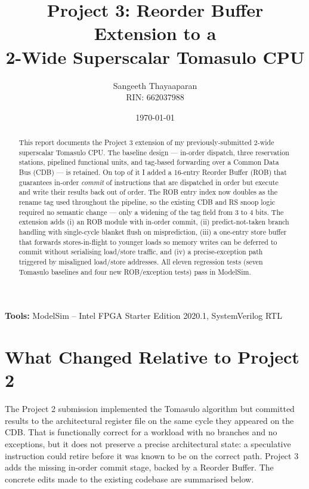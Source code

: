 \documentclass[11pt]{article}
\title{Project 3: Reorder Buffer Extension to a\\2-Wide Superscalar Tomasulo CPU}
\author{Sangeeth Thayaaparan \\ RIN: 662037988}
\date{\today}
\begin{document}
\maketitle

\begin{center}
  \large\textbf{Tools:} ModelSim -- Intel FPGA Starter Edition 2020.1, SystemVerilog RTL
\end{center}

\begin{abstract}
  This report documents the Project 3 extension of my previously-submitted 2-wide
  superscalar Tomasulo CPU. The baseline design --- in-order dispatch, three
  reservation stations, pipelined functional units, and tag-based forwarding over a
  Common Data Bus (CDB) --- is retained. On top of it I added a 16-entry Reorder
  Buffer (ROB) that guarantees in-order \emph{commit} of instructions that are
  dispatched in order but execute and write their results back out of order. The
  ROB entry index now doubles as the rename tag used throughout the pipeline, so
  the existing CDB and RS snoop logic required no semantic change --- only a
  widening of the tag field from 3 to 4 bits. The extension adds (i) an ROB
  module with in-order commit, (ii) predict-not-taken branch handling with
  single-cycle blanket flush on misprediction, (iii) a one-entry store buffer
  that forwards stores-in-flight to younger loads so memory writes can be deferred
  to commit without serialising load/store traffic, and (iv) a precise-exception
  path triggered by misaligned load/store addresses. All eleven regression tests
  (seven Tomasulo baselines and four new ROB/exception tests) pass in ModelSim.
\end{abstract}

\tableofcontents
\listoffigures
\listoftables

\newpage

\section{What Changed Relative to Project 2}
\label{sec:what_changed}

The Project 2 submission implemented the Tomasulo algorithm but committed results
to the architectural register file on the same cycle they appeared on the CDB.
That is functionally correct for a workload with no branches and no exceptions,
but it does not preserve a precise architectural state: a speculative instruction
could retire before it was known to be on the correct path.  Project 3 adds the
missing in-order commit stage, backed by a Reorder Buffer.  The concrete
edits made to the existing codebase are summarised below.
\end{document}
